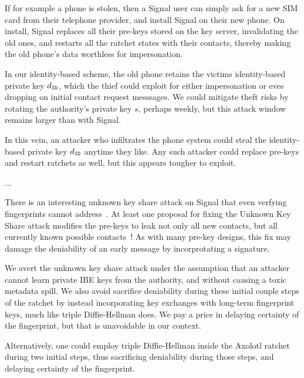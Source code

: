 \documentclass[twoside,letterpaper]{sig-alternate}
\begin{document}
If for example a phone is stolen, then a Signal user can simply ask
for a new SIM card from their telephone provider, and install Signal
on their new phone.  On install, Signal replaces all their pre-keys 
stored on the key server, invalidating the old ones, and restarts all
the ratchet states with their contacts, thereby making the old phone's
data worthless for impersonation. 

In our identity-based scheme, the old phone retains the victims
identity-based private key $d_{\mathtt{ID}}$, which the thief could exploit for
either impersonation or eves dropping on initial contact request messsages.
We could mitigate theft risks by rotating the authority's private key $s$,
perhaps weekly, but this attack window remains larger than with Signal.

In this vein, an attacker who infiltrates the phone system could steal
the identity-based private key $d_{\mathtt{ID}}$ anytime they like.  
Any such attacker could replace pre-keys and restart ratchets as well,
but this appears tougher to exploit.

\smallskip


\smallskip

...

There is an interesting unknown key share attack on Signal that
even verfying fingerprints cannot address~\cite[\S4.2]{TextSecure}.
At least one proposal for fixing the Unknown Key Share attack
modifies the pre-keys to leak not only all new contacts, but
all currently known possible contacts~\cite[\S4.3]{TextSecure}! 
As with many pre-key designs, this fix may damage the deniability
 of an early message by incorprotating a signature.

We avert the unknown key share attack under the assumption that
an attacker cannot learn private IBE keys from the authority, and
 without causing a toxic metadata spill.
We also avoid sacrifice deniability during these initial couple steps of
the ratchet by instead incorporating key exchanges with long-term
fingerprint keys, much like triple Diffie-Hellman does.
We pay a price in delaying certainty of the fingerprint, but
 that is unavoidable in our context.


Alternatively, one could employ triple Diffie-Hellman inside the
Axolotl ratchet during two initial steps,
 thus sacrificing deniability during those steps,
 and delaying certainty of the fingerprint. 
\end{document}
